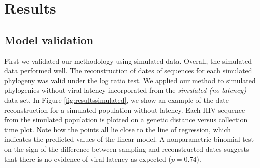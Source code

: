 \documentclass{bmcart}
\begin{document}
\section * {Results} \label{sec:results}


\subsection * {Model validation} \label{sec:simresults}
First we validated our methodology using simulated data.
Overall, the simulated data performed well. The reconstruction of dates of sequences for each simulated phylogeny was valid under the log ratio test.
We applied our method to simulated phylogenies without viral latency incorporated from the \emph{simulated (no latency)} data set.
In Figure \ref{fig:resultssimulated}, we show an example of the date reconstruction for a simulated population without latency.
Each HIV sequence from the simulated population is plotted on a genetic distance versus collection time plot.
Note how the points all lie close to the line of regression, which indicates the predicted values of the linear model.
A nonparametric binomial test on the sign of the difference between sampling and reconstructed dates suggests that there is no evidence of viral latency as expected ($p = 0.74$).




\end{document}
